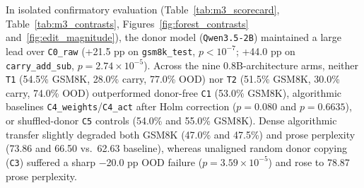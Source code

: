 \documentclass[11pt]{article}
\begin{document}
In isolated confirmatory evaluation (Table~\ref{tab:m3_scorecard}, Table~\ref{tab:m3_contrasts}, Figures~\ref{fig:forest_contrasts} and~\ref{fig:edit_magnitude}), the donor model (\texttt{Qwen3.5-2B}) maintained a large lead over \texttt{C0\_raw} (+21.5 pp on \texttt{gsm8k\_test}, $p < 10^{-7}$; +44.0 pp on \texttt{carry\_add\_sub}, $p = 2.74\times 10^{-5}$). Across the nine 0.8B-architecture arms, neither \texttt{T1} (54.5\% GSM8K, 28.0\% carry, 77.0\% OOD) nor \texttt{T2} (51.5\% GSM8K, 30.0\% carry, 74.0\% OOD) outperformed donor-free \texttt{C1} (53.0\% GSM8K), algorithmic baselines \texttt{C4\_weights}/\texttt{C4\_act} after Holm correction ($p = 0.080$ and $p = 0.6635$), or shuffled-donor \texttt{C5} controls (54.0\% and 55.0\% GSM8K). Dense algorithmic transfer slightly degraded both GSM8K (47.0\% and 47.5\%) and prose perplexity (73.86 and 66.50 vs.\ 62.63 baseline), whereas unaligned random donor copying (\texttt{C3}) suffered a sharp $-$20.0 pp OOD failure ($p = 3.59\times 10^{-5}$) and rose to 78.87 prose perplexity.
\end{document}
